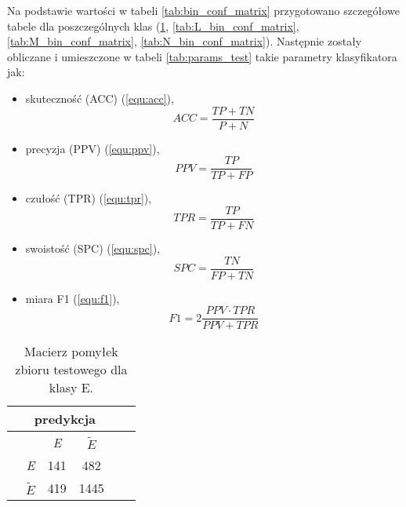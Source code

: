 {Na podstawie wartości w tabeli \ref{tab:bin_conf_matrix} przygotowano szczegółowe tabele dla poszczególnych klas (\ref{tab:E_bin_conf_matrix}, \ref{tab:L_bin_conf_matrix}, \ref{tab:M_bin_conf_matrix}, \ref{tab:N_bin_conf_matrix}). Następnie zostały obliczane i umieszczone w tabeli \ref{tab:params_test} takie parametry klasyfikatora jak: 
\begin{itemize}
\item skuteczność (ACC) (\ref{equ:acc}),
\begin{equation}
ACC = \frac{TP + TN}{P + N}
\label{equ:acc}
\end{equation}

\item precyzja (PPV) (\ref{equ:ppv}),
\begin{equation}
PPV = \frac{TP}{TP + FP}
\label{equ:ppv}
\end{equation}

\item czułość (TPR) (\ref{equ:tpr}),
\begin{equation}
TPR = \frac{TP}{TP + FN}
\label{equ:tpr}
\end{equation}

\item swoistość (SPC) (\ref{equ:spc}),
\begin{equation}
SPC = \frac{TN}{FP + TN}
\label{equ:spc}
\end{equation}

\item miara F1 (\ref{equ:f1}),
\begin{equation}
F1 = 2 \frac{PPV \cdot TPR}{PPV + TPR}
\label{equ:f1}
\end{equation}
\end{itemize}

\begin{table}[h!]
\centering
\caption[Short Heading]{Macierz pomyłek zbioru testowego dla klasy E.}
\label{tab:E_bin_conf_matrix}
\begin{tabular}{|c|c|c|c|c|c|}
\hline
\textbf{}                           & \multicolumn{3}{c|}{\textbf{predykcja}} \\ \hline
{\multirow{3}{*}{\rotatebox[origin=c]{90}{\textbf{klasa}}}} &         & \textit{E}     & $\widetilde{E}$ \\ \cline{2-4} 
                                    & \textit{E}      & 141     & 482   \\ \cline{2-4} 
                                    & $\widetilde{E}$       & 419      & 1445   \\ \hline
\end{tabular}
\end{table}

}
